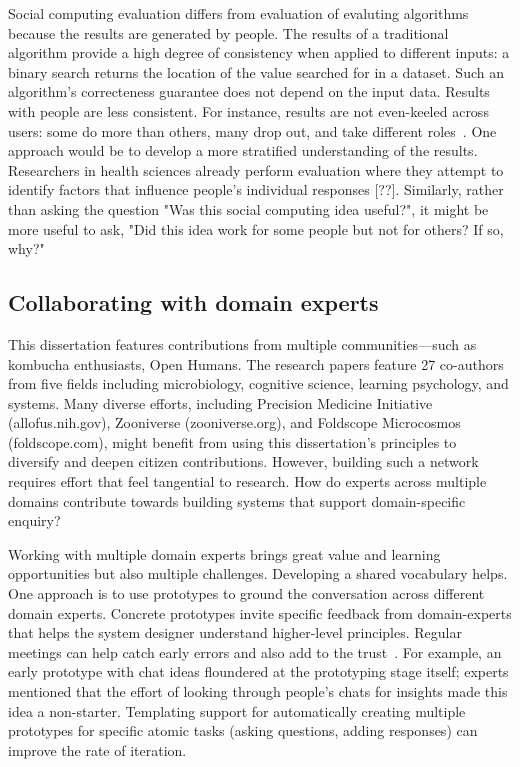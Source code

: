 Social computing evaluation differs from evaluation of evaluting algorithms because the results are generated by people. The results of a traditional algorithm provide a high degree of consistency when applied to different inputs: a binary search returns the location of the value searched for in a dataset. Such an algorithm's correcteness guarantee does not depend on the input data. Results with people are less consistent. For instance, results are not even-keeled across users: some do more than others, many drop out, and take different roles~\cite{Bryant2005}. One approach would be to develop a more stratified understanding of the results. Researchers in health sciences already perform evaluation where they attempt to identify factors that influence people's individual responses [??]. Similarly, rather than asking the question "Was this social computing idea useful?", it might be more useful to ask, "Did this idea work for some people but not for others? If so, why?"


\subsection{Collaborating with domain experts}
This dissertation features contributions from multiple communities—such as kombucha enthusiasts, Open Humans. The research papers feature 27 co-authors from five fields including microbiology, cognitive science, learning psychology, and systems. Many diverse efforts, including Precision Medicine Initiative (allofus.nih.gov), Zooniverse (zooniverse.org), and Foldscope Microcosmos (foldscope.com), might benefit from using this dissertation’s principles to diversify and deepen citizen contributions. However, building such a network requires effort that feel tangential to research. How do experts across multiple domains contribute towards building systems that support domain-specific enquiry? 

Working with multiple domain experts brings great value and learning opportunities but also multiple challenges. Developing a shared vocabulary helps. One approach is to use prototypes to ground the conversation across different domain experts. Concrete prototypes invite specific feedback from domain-experts that helps the system designer understand higher-level principles. Regular meetings can help catch early errors and also add to the trust~\cite{rocco1998trust}. For example, an early prototype with chat ideas floundered at the prototyping stage itself; experts mentioned that the effort of looking through people's chats for insights made this idea a non-starter. Templating support for automatically creating multiple prototypes for specific atomic tasks (asking questions, adding responses) can improve the rate of iteration.

